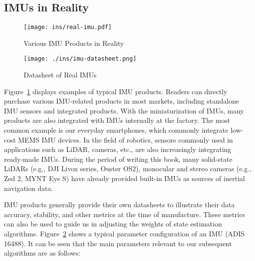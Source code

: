 \subsection{IMUs in Reality}
\begin{figure}
	\centering
	\texttt{[image: ins/real-imu.pdf]}
	\caption{Various IMU Products in Reality}
	\label{fig:real-imus}
\end{figure}


\begin{figure}
	\centering
	\texttt{[image: ./ins/imu-datasheet.png]}
	\caption{Datasheet of Real IMUs}
	\label{fig:imu-datasheet}
\end{figure}

Figure~\ref{fig:real-imus} displays examples of typical IMU products. Readers can directly purchase various IMU-related products in most markets, including standalone IMU sensors and integrated products. With the miniaturization of IMUs, many products are also integrated with IMUs internally at the factory. The most common example is our everyday smartphones, which commonly integrate low-cost MEMS IMU devices. In the field of robotics, sensors commonly used in applications such as LiDAR, cameras, etc., are also increasingly integrating ready-made IMUs. During the period of writing this book, many solid-state LiDARs (e.g., DJI Livox series, Ouster OS2), monocular and stereo cameras (e.g., Zed 2, MYNT Eye S) have already provided built-in IMUs as sources of inertial navigation data.

IMU products generally provide their own datasheets to illustrate their data accuracy, stability, and other metrics at the time of manufacture. These metrics can also be used to guide us in adjusting the weights of state estimation algorithms. Figure~\ref{fig:imu-datasheet} shows a typical parameter configuration of an IMU (ADIS 16488). It can be seen that the main parameters relevant to our subsequent algorithms are as follows:

